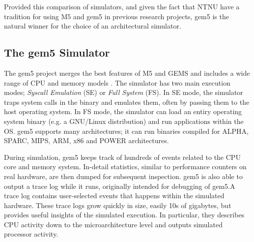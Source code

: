 Provided this comparison of simulators, and given the fact that NTNU have a
tradition for using M5 and gem5 in previous research projects, gem5 is the
natural winner for the choice of an architectural simulator.


\subsection{The gem5 Simulator}

The gem5 project \cite{gem5} merges the best features of M5 \cite{binkert2006m5}
and GEMS \cite{GEMS} and includes a wide range of CPU and memory models
\cite{gem5hipeac}. The simulator has two main execution modes; \textit{Syscall
Emulation} (SE) or \textit{Full System} (FS). In SE mode, the simulator traps
system calls in the binary and emulates them, often by passing them to the host
operating system. In FS mode, the simulator can load an entiry operating system
binary (e.g. a GNU/Linux distribution) and run applications within the OS. gem5
supports many architectures; it can run binaries compiled for ALPHA, SPARC,
MIPS, ARM, x86 and POWER architectures.

During simulation, gem5 keeps track of hundreds of events related to the CPU
core and memory system. In-detail statistics, similar to performance counters on
real hardware, are then dumped for subsequent inspection. gem5 is also able to
output a trace log while it runs, originally intended for debugging of gem5.A
trace log contains user-selected events that happens within the simulated
hardware. These trace logs grow quickly in size, easily 10s of gigabytes, but
provides useful insights of the simulated execution. In particular, they describes
CPU activity down to the microarchitecture level and outputs simulated processor
activity.

